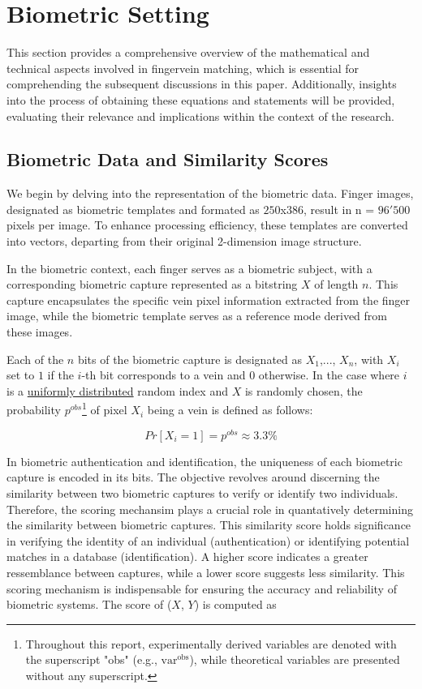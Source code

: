 
\section{Biometric Setting}
This section provides a comprehensive overview of the mathematical and technical aspects involved in fingervein matching, which is essential for comprehending the subsequent discussions in this paper. Additionally, insights into the process of obtaining these equations and statements will be provided, evaluating their relevance and implications within the context of the research. 

\subsection{Biometric Data and Similarity Scores}
\label{Bio_data_sim_scores}
We begin by delving into the representation of the biometric data. Finger images, designated as biometric templates and formated as \(250\)x\(386\), result in n = \(96'500\) pixels per image. To enhance processing efficiency, these templates are converted into vectors, departing from their original 2-dimension image structure. 

In the biometric context, each finger serves as a biometric subject, with a corresponding biometric capture represented as a bitstring \(X\) of length \(n\). This capture encapsulates the specific vein pixel information extracted from the finger image, while the biometric template serves as a reference mode derived from these images. 

Each of the \(n\) bits of the biometric capture is designated as \(X_1\),..., \(X_n\), with \(X_i\) set to \(1\) if the \(i\)-th bit corresponds to a vein and \(0\) otherwise. In the case where \(i\) is a \hyperref[def:Uniform Distribution]{uniformly distributed} random index and \(X\) is randomly chosen, the probability \(p^{obs}\)\footnote{Throughout this report, experimentally derived variables are denoted with the superscript "obs" (e.g., \( \text{var}^{\text{obs}} \)), while theoretical variables are presented without any superscript.} of pixel \(X_i\) being a vein is defined as follows:

\begin{equation} \label{eq:proba}
    Pr[X_i = 1] = p^{obs} \approx 3.3 \% 
\end{equation}

In biometric authentication and identification, the uniqueness of each biometric capture is encoded in its bits. The objective revolves around discerning the similarity between two biometric captures to verify or identify two individuals. Therefore, the scoring mechansim plays a crucial role in quantatively determining the similarity between biometric captures. This similarity score holds significance in verifying the identity of an individual (authentication) or identifying potential matches in a database (identification). A higher score indicates a greater ressemblance between captures, while a lower score suggests less similarity. This scoring mechanism is indispensable for ensuring the accuracy and reliability of biometric systems. The score of (\(X\), \(Y\)) is computed as

